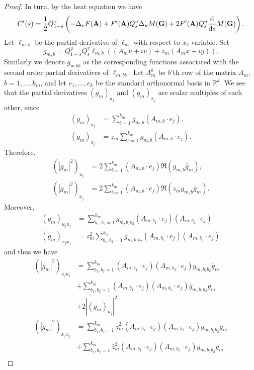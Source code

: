 \documentclass[10pt,a4paper]{amsart}
\begin{document}
\begin{proof}
In turn, by the heat equation we have
		\begin{equation*}
			C'(s)=\frac{1}{2}Q_{1-s}^x\left(-\Delta_xF({\bf{A}})+F'({\bf{A}})Q_s^u\Delta_uM({\bf{G}}) +2F'({\bf{A}}) Q_s^u\frac{\mathrm{d}}{\mathrm{d} s} M({\bf{G}})\right).
		\end{equation*}
		Let $\ell_{m,b}$ be the partial derivative of $\ell_m$ with respect to $x_b$ variable. Set
		\begin{equation*}
			g_{m,b}=Q_{1-s}^yQ_s^v    \ell_{m,b}((A_m u+iv)+z_m(A_m x+iy)).
		\end{equation*}
	Similarly we denote $g_{m.bb}$ as the corresponding functions associated with the second order partial derivatives of $\ell_{m,bb}$. Let $A_m^b$ be $b$'th row of the matrix $A_m$, $b=1,\ldots,k_m$,  and let $ e_1, \ldots, e_k $ be the standard orthonormal basis in $ \mathbb{R}^k$.	We see that the partial derivatives $(g_m)_{u_j}$ and $(g_m)_{x_j}$ are scalar multiples of each other, since
		\begin{align*}
			(g_m)_{u_j}&=\sum_{b=1}^{k_m}g_{m,b}(A_{m,b}\cdot e_j),\\
			(g_m)_{x_j}&=z_m \sum_{b=1}^{k_m}g_{m,b}(A_{m,b}\cdot e_j).
		\end{align*}
		Therefore,
	\begin{align*}
		(|g_m|^{2})_{u_j}&= 2\sum_{b=1}^{k_m}(A_{m,b}\cdot e_j) \Re(g_{m,b} \bar{g}_m ),  \\ 
		(|g_m|^{2})_{x_j}&=2\sum_{b=1}^{k_m}(A_{m,b}\cdot e_j) \Re(z_m g_{m,b} \bar{g}_m ).
	\end{align*}
	Moreover,
	\begin{align*}
		(g_m)_{u_ju_j}&=\sum_{b_1, b_2=1}^{k_m}g_{m,b_1b_2}(A_{m,b_1}\cdot e_j)(A_{m,b_2}\cdot e_j)\\
		(g_m)_{x_jx_j}&=z_m^2\sum_{b_1, b_2=1}^{k_m}g_{m,b_1b_2}(A_{m,b_1}\cdot e_j)(A_{m,b_2}\cdot e_j)
	\end{align*}
and thus we have
		\begin{align*}
			(|g_m|^2)_{u_ju_j}&=  \sum_{b_1, b_2=1}^{k_m}(A_{m,b_1}\cdot e_j)(A_{m,b_2}\cdot e_j)g_{m,b_1b_2}\bar{g}_m\\
			&+\sum_{b_1, b_2=1}^{k_m}(A_{m,b_1}\cdot e_j)(A_{m,b_2}\cdot e_j)\bar{g}_{m,b_1b_2}g_m  \\
			&+2|(g_m)_{u_j}|^2  \\
			(|g_m|^{2})_{x_jx_j}&=  \sum_{b_1, b_2=1}^{k_m}z_m^2(A_{m,b_1}\cdot e_j)(A_{m,b_2}\cdot e_j)g_{m,b_1b_2}\bar{g}_m\\
			&+\sum_{b_1, b_2=1}^{k_m}\bar{z}_m^2(A_{m,b_1}\cdot e_j)(A_{m,b_2}\cdot e_j)\bar{g}_{m,b_1b_2}g_m\\

\end{align*}
\end{proof}
\end{document}
